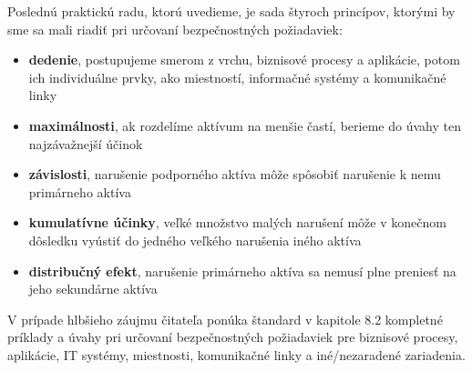 Poslednú praktickú radu, ktorú uvedieme, je sada štyroch princípov, ktorými by sme sa mali riadiť pri určovaní
bezpečnostných požiadaviek:
\begin{itemize}[nosep]
    \item \textbf{dedenie}, postupujeme smerom z vrchu, biznisové procesy a aplikácie, potom ich individuálne prvky, ako miestností, informačné systémy a komunikačné linky
    \item \textbf{maximálnosti}, ak rozdelíme aktívum na menšie častí, berieme do úvahy ten najzávažnejší účinok
    \item \textbf{závislosti}, narušenie podporného aktíva môže spôsobiť narušenie k nemu primárneho aktíva
    \item \textbf{kumulatívne účinky}, veľké množstvo malých narušení môže v konečnom dôsledku vyústiť do jedného veľkého narušenia iného aktíva
    \item \textbf{distribučný efekt}, narušenie primárneho aktíva sa nemusí plne preniesť na jeho sekundárne aktíva
\end{itemize}

V prípade hlbšieho záujmu čitateľa ponúka štandard \cite{BSI2} v kapitole 8.2 kompletné príklady a úvahy pri určovaní
bezpečnostných požiadaviek pre biznisové procesy, aplikácie, IT systémy, miestnosti, komunikačné linky a
iné/nezaradené zariadenia.